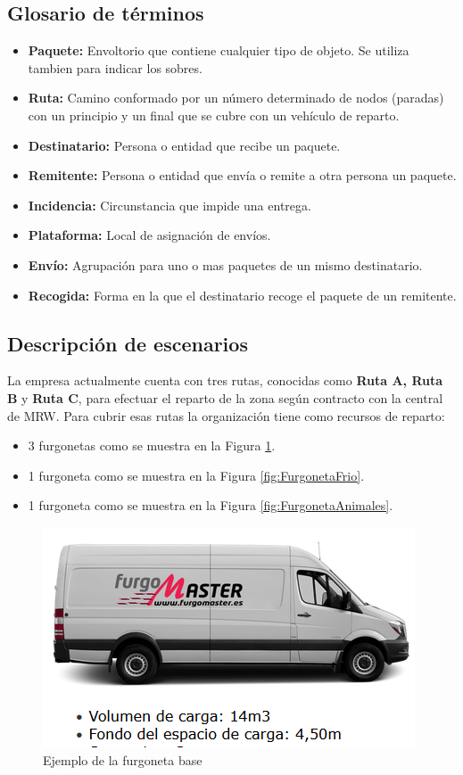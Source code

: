 \subsection{Glosario de términos}
\begin{itemize}
	\item \textbf{Paquete:} Envoltorio que contiene cualquier tipo de objeto. Se utiliza tambien para indicar los sobres.
	\item \textbf{Ruta:} Camino conformado por un número determinado de nodos (paradas) con un principio y un final que se cubre con un vehículo de reparto.  
	\item \textbf{Destinatario:} Persona o entidad que recibe un paquete.
	\item \textbf{Remitente:} Persona o entidad que envía o remite a otra persona un paquete.
	\item \textbf{Incidencia:} Circunstancia que impide una entrega.
	\item \textbf{Plataforma:} Local de asignación de envíos.
	\item \textbf{Envío:} Agrupación para uno o mas paquetes de un mismo destinatario.
	\item \textbf{Recogida:} Forma en la que el destinatario recoge el paquete de un remitente.
\end{itemize}

\subsection{Descripción de escenarios}
La empresa actualmente cuenta con tres rutas, conocidas como \textbf{Ruta A, Ruta B} y \textbf{Ruta C}, para efectuar el reparto de la zona según contracto con la central de MRW. Para cubrir esas rutas la organización tiene como recursos de reparto:
\begin{itemize}
  \item 3 furgonetas como se muestra en la Figura \ref{fig:FurgonetaBase}.
  \item 1 furgoneta como se muestra en la Figura \ref{fig:FurgonetaFrio}.
  \item 1 furgoneta como se muestra en la Figura \ref{fig:FurgonetaAnimales}.
\end{itemize}

\begin{figure}[H]
  \centering
  \includegraphics[scale=0.50]{imaxes/FurgonetaBase.png}
  \caption{\label{fig:FurgonetaBase}Ejemplo de la furgoneta base}
\end{figure}

